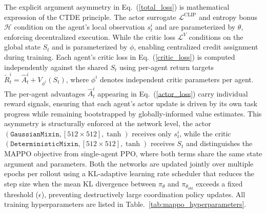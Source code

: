 \documentclass[lettersize,journal]{IEEEtran}
\begin{document}
The explicit argument asymmetry in Eq.~(\ref{total_loss}) is mathematical expression of the CTDE principle. The actor surrogate $\mathcal{L}^{\text{CLIP}}$ and entropy bonus $\mathcal{H}$ condition on the agent's local observation $s_t^i$ and are parameterized by $\theta$, enforcing decentralized execution. While the critic loss $\mathcal{L}^{V}$ conditions on the global state $S_t$ and is parameterized by $\phi$, enabling centralized credit assignment during training. Each agent's critic loss in Eq.~(\ref{critic_loss}) is computed independently against the shared $S_t$ using per-agent return targets $\tilde{R}_t^i = \hat{A}_t^i + V_{\phi^i}(S_t)$, where $\phi^i$ denotes independent critic parameters per agent. The per-agent advantages $\hat{A}_t^i$ appearing in Eq.~(\ref{actor_loss}) carry individual reward signals, ensuring that each agent's actor update is driven by its own task progress while remaining bootstrapped by globally-informed value estimates. This asymmetry is structurally enforced at the network level, the actor $(\texttt{GaussianMixin}, [512 \times 512], \tanh)$ receives only $s_t^i$, while the critic $(\texttt{DeterministicMixin}, [512 \times 512], \tanh)$ receives $S_t$ and distinguishes the MAPPO objective from single-agent PPO, where both terms share the same state argument and parameters. Both the networks are updated jointly over multiple epochs per rollout using a KL-adaptive learning rate scheduler that reduces the step size when the mean KL divergence between $\pi_{\theta}$ and $\pi_{\theta_{\text{old}}}$ exceeds a fixed threshold ($\epsilon$), preventing destructively large coordination policy updates. All training hyperparameters are listed in Table.~\ref{tab:mappo_hyperparameters}.
\end{document}
